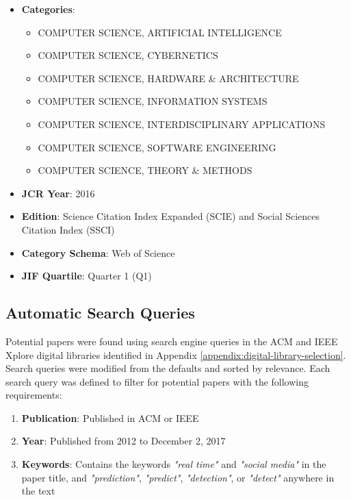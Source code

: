 \begin{appendices}
\begin{itemize}
  \item \textbf{Categories}:
	\begin{itemize}
		\item COMPUTER SCIENCE, ARTIFICIAL INTELLIGENCE
		\item COMPUTER SCIENCE, CYBERNETICS
		\item COMPUTER SCIENCE, HARDWARE \& ARCHITECTURE
		\item COMPUTER SCIENCE, INFORMATION SYSTEMS
		\item COMPUTER SCIENCE, INTERDISCIPLINARY APPLICATIONS
		\item COMPUTER SCIENCE, SOFTWARE ENGINEERING
		\item COMPUTER SCIENCE, THEORY \& METHODS
	\end{itemize}
  \item \textbf{JCR Year}: 2016
  \item \textbf{Edition}: Science Citation Index Expanded (SCIE) \citep{Garfield:2006a} and Social Sciences Citation Index (SSCI) \citep{Klein:2004}
  \item \textbf{Category Schema}: Web of Science \citep{Clarivate:2017b}
  \item \textbf{JIF Quartile}: Quarter 1 (Q1)
\end{itemize}

\subsection{Automatic Search Queries} \label{appendix:automatic-search-queries}

Potential papers were found using search engine queries in the ACM \citep{ACM:2017} and IEEE Xplore \citep{IEEE:2017} digital libraries identified in Appendix \ref{appendix:digital-library-selection}. Search queries were modified from the defaults and sorted by relevance. Each search query was defined to filter for potential papers with the following requirements:

\begin{enumerate}[label=(\alph*)]
	\item \textbf{Publication}: Published in ACM or IEEE
	\item \textbf{Year}: Published from 2012 to December 2, 2017
	\item \textbf{Keywords}: Contains the keywords \textit{"real time"} and \textit{"social media"} in the paper title, and \textit{"prediction"}, \textit{"predict"}, \textit{"detection"}, or \textit{"detect"} anywhere in the text
\end{enumerate}


\end{appendices}
